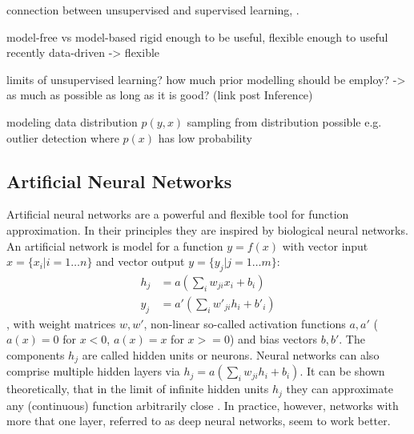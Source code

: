 		connection between unsupervised and supervised learning, \cite{goodfellow16dlb}.

		model-free vs model-based
		rigid enough to be useful, flexible enough to useful
		recently data-driven -> flexible

		limits of unsupervised learning?
		how much prior modelling should be employ?
		-> as much as possible as long as it is good? (link post Inference)

		modeling data distribution $p(y, x)$
		sampling from distribution possible
		e.g. outlier detection where $p(x)$ has low probability


	\subsection{Artificial Neural Networks}\label{sec:neuralnetworks}
		Artificial neural networks are a powerful and flexible tool for function approximation. In their principles they are inspired by biological neural networks. An artificial network is model for a function $y = f(x)$ with vector input $x = \{ x_i | i = 1 \ldots n \}$ and vector output $y = \{ y_j | j = 1 \ldots m \}$:
		\begin{equation} \label{eq1}
			\begin{split}
				h_j & =  a (\sum_i w_{ji} x_i + b_i)  \\
				y_j & =  a' (\sum_i w'_{ji} h_i + b'_i)
			\end{split}
		\end{equation},
		with weight matrices $w, w'$, non-linear so-called activation functions $a, a'$ (\eg $a(x)=0$ for $x<0$, $a(x)=x$ for $x>=0$) and bias vectors $b, b'$.
		The components $h_j$ are called hidden units or neurons. Neural networks can also comprise multiple hidden layers via $h_j  =  a (\sum_i w_{ji} h_i + b_i)$.
		It can be shown theoretically, that in the limit of infinite hidden units $h_j$ they can approximate any (continuous) function arbitrarily close \cite{cybenko89approx} .
		In practice, however, networks with more that one layer, referred to as deep neural networks, seem to work better.

